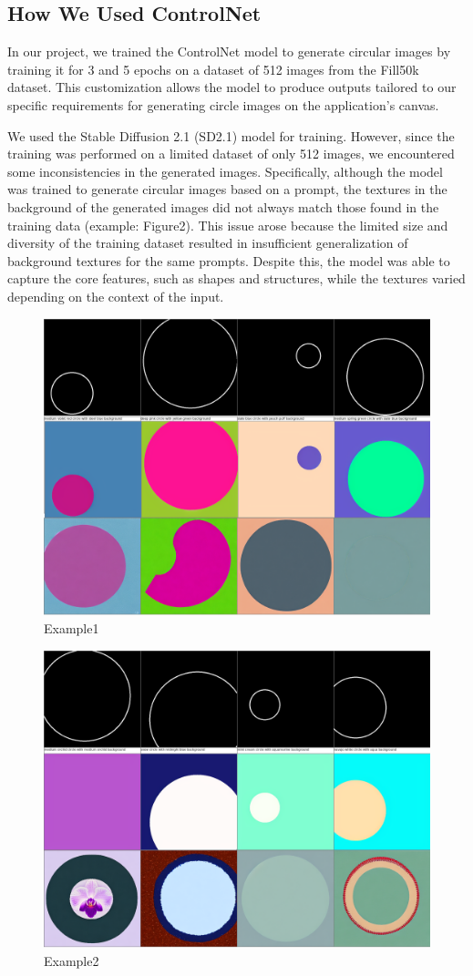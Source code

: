 \documentclass[12pt,a4paper]{report}
\begin{document}
\subsection*{How We Used ControlNet}
In our project, we trained the ControlNet model to generate circular images by training it for 3 and 5 epochs on a dataset of 512 images from the Fill50k dataset. This customization allows the model to produce outputs tailored to our specific requirements for generating circle images on the application’s canvas.

We used the Stable Diffusion 2.1 (SD2.1) model for training. However, since the training was performed on a limited dataset of only 512 images, we encountered some inconsistencies in the generated images. Specifically, although the model was trained to generate circular images based on a prompt, the textures in the background of the generated images did not always match those found in the training data (example: Figure2). This issue arose because the limited size and diversity of the training dataset resulted in insufficient generalization of background textures for the same prompts. Despite this, the model was able to capture the core features, such as shapes and structures, while the textures varied depending on the context of the input.

\begin{figure}
    \centering
    \includegraphics[width=1\linewidth]{t1e0.png}
    \caption{Example1}
\end{figure}

\begin{figure}
    \centering
    \includegraphics[width=1\linewidth]{t1e2.png}
    \caption{Example2}
\end{figure}
\end{document}

